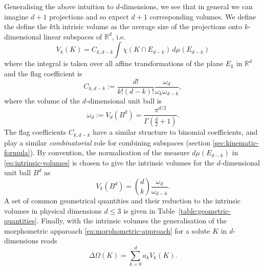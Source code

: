 Generalising the above intuition to $d$-dimensions, we see that in general we can imagine $d+1$ projections and so expect $d+1$ corresponding volumes.
We define the define the $k$th intrisic volume as the average size of the projections onto $k$-dimensional linear subspaces of $\mathbb{R}^d$, i.e.\
\begin{equation}\label{eq:intrinsic-volumes}
  V_k(K)
  =
  C_{k,d-k}
  \int \chi(K \cap E_{d-k}) \, d\mu(E_{d-k})
\end{equation}
where the integral is taken over all affine transformations of the plane $E_k$ in $\mathbb{R}^d$ and the flag coefficient is
\begin{equation}\label{eq:flag-coefficients}
  C_{k,d-k}
  :=
  \frac{d!}{k! (d-k)!} \frac{\omega_d}{\omega_k \omega_{d-k}},
\end{equation}
where the volume of the $d$-dimensional unit ball is
\begin{equation}
  \omega_d := V_d(B^d) = \frac{\pi^{d/2}}{\Gamma(\frac{d}{2} + 1)}.
\end{equation}
The flag coefficients $C_{k,d-k}$ have a similar structure to binomial coefficients, and play a similar \emph{combinatorial} role for combining subspaces (section \ref{sec:kinematic-formula}).
By convention, the normalisation of the measure $d\mu(E_{d-k})$ in \eqref{eq:intrinsic-volumes} is chosen to give the intrinsic volumes for the $d$-dimensional unit ball $B^d$ as
\begin{equation}\label{eq:intrinsic-volume-ball}
  V_k (B^d)
  =
  {d \choose k} \frac{\omega_d}{\omega_{d-k}}.
\end{equation}
A set of common geometrical quantities and their reduction to the intrinsic volumes in physical dimensions $d \le 3$ is given in Table~\ref{table:geometric-quantities}.
Finally, with the intrinsic volumes the generalisation of the morphometric apparoach \eqref{eq:morphometric-approach} for a solute $K$ in $d$-dimensions reads
\begin{equation}\label{eq:morphometric-approach-d}
  \Delta \Omega(K)
  =
  \sum_{k=0}^d a_k V_k(K).
\end{equation}

